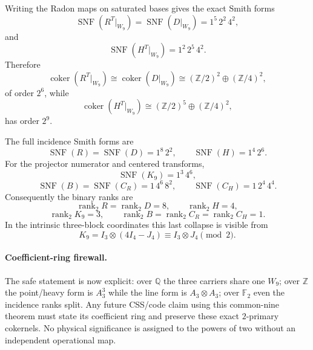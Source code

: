 Writing the Radon maps on saturated bases gives the exact Smith forms
\[
 \boxed{
 \operatorname{SNF}(R^T|_{W_9})
 =\operatorname{SNF}(D|_{W_9})
 =1^5\,2^2\,4^2,
 }
\]
and
\[
 \boxed{
 \operatorname{SNF}(H^T|_{W_9})
 =1^2\,2^5\,4^2.
 }
\]
Therefore
\[
 \boxed{
 \operatorname{coker}(R^T|_{W_9})
 \cong\operatorname{coker}(D|_{W_9})
 \cong(\mathbb Z/2)^2\oplus(\mathbb Z/4)^2,
 }
\]
of order $2^6$, while
\[
 \boxed{
 \operatorname{coker}(H^T|_{W_9})
 \cong(\mathbb Z/2)^5\oplus(\mathbb Z/4)^2,
 }
\]
has order $2^9$.

The full incidence Smith forms are
\[
 \boxed{\operatorname{SNF}(R)=\operatorname{SNF}(D)=1^8\,2^2},
 \qquad
 \boxed{\operatorname{SNF}(H)=1^4\,2^6}.
\]
For the projector numerator and centered transforms,
\[
 \boxed{\operatorname{SNF}(K_9)=1^3\,4^6},
\]
\[
 \boxed{\operatorname{SNF}(B)=\operatorname{SNF}(C_R)=1\,4^6\,8^2},
\qquad
 \boxed{\operatorname{SNF}(C_H)=1\,2^4\,4^4}.
\]
Consequently the binary ranks are
\[
 \boxed{\operatorname{rank}_2R=\operatorname{rank}_2D=8},
 \qquad
 \boxed{\operatorname{rank}_2H=4},
\]
\[
 \boxed{\operatorname{rank}_2K_9=3},
 \qquad
 \boxed{\operatorname{rank}_2B
 =\operatorname{rank}_2C_R
 =\operatorname{rank}_2C_H=1}.
\]
In the intrinsic three-block coordinates this last collapse is visible from
\[
 K_9=I_3\otimes(4I_4-J_4)
 \equiv I_3\otimes J_4\pmod2.
\]

\paragraph{Coefficient-ring firewall.}
The safe statement is now explicit: over $\mathbb Q$ the three carriers share
one $W_9$; over $\mathbb Z$ the point/heavy form is $A_3^3$ while the line form
is $A_3\otimes A_3$; over $\mathbb F_2$ even the incidence ranks split.  Any
future CSS/code claim using this common-nine theorem must state its coefficient
ring and preserve these exact $2$-primary cokernels.  No physical significance
is assigned to the powers of two without an independent operational map.
